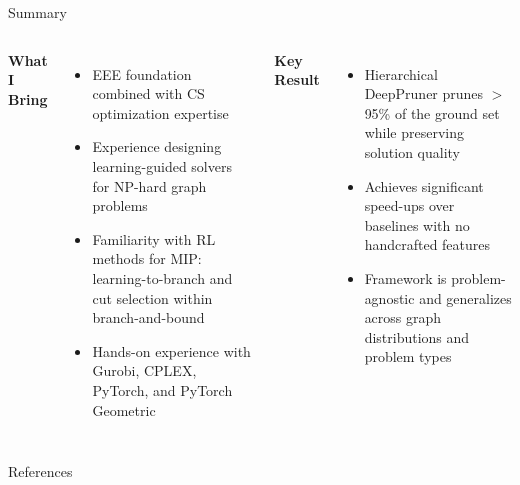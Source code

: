 \documentclass[aspectratio=169,xcolor=dvipsnames]{beamer}
\begin{document}
\begin{frame}[plain]{Summary}
\begin{columns}[T,onlytextwidth]
    \textbf{What I Bring}
    \begin{itemize}
        \item[\faGraduationCap] EEE foundation combined with CS optimization expertise
        \item[\faCogs] Experience designing learning-guided solvers for NP-hard graph problems
        \item[\faRobot] Familiarity with RL methods for MIP: learning-to-branch and cut selection within branch-and-bound
        \item[\faWrench] Hands-on experience with Gurobi, CPLEX, PyTorch, and PyTorch Geometric
    \end{itemize}

    \textbf{Key Result}
    \begin{itemize}
        \item[\faCut] Hierarchical DeepPruner prunes $>$95\% of the ground set while preserving solution quality
        \item[\faBolt] Achieves significant speed-ups over baselines with no handcrafted features
        \item[\faForward] Framework is problem-agnostic and generalizes across graph distributions and problem types
    \end{itemize}
\end{columns}
\end{frame}

\begin{frame}[plain]{References}
  
  
\end{frame}
\end{document}
